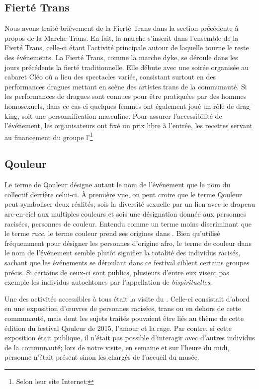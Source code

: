 \subsection{Fierté Trans}
\label{subsec:fiertetrans}
Nous avons traité brièvement de la Fierté Trans dans la section précédente à propos de la Marche Trans.
En fait, la marche s'inscrit dans l'ensemble de la Fierté Trans, celle-ci étant l'activité principale autour de laquelle tourne le reste des événements.
La Fierté Trans, comme la marche dyke, se déroule dans les jours précédents la fierté traditionnelle.
Elle débute avec une soirée organisée au cabaret Cléo où a lieu des spectacles variés, consistant surtout en des performances dragues mettant en scène des artistes trans de la communauté.
Si les performances de dragues sont connues pour être pratiquées par des hommes homosexuels, dans ce cas-ci quelques femmes ont également joué un rôle de drag-king, soit une personnification masculine.
Pour assurer l'accessibilité de l'événement, les organisateurs ont fixé un prix libre à l'entrée, les recettes servant au financement du groupe l'\astteq{}\footnote{Selon leur site Internet: }

\subsection{Qouleur}
\label{subsec:qouleur}
Le terme de Qouleur désigne autant le nom de l'événement que le nom du collectif derrière celui-ci.
À première vue, on peut croire que le terme Qouleur peut symboliser deux réalités, sois la diversité sexuelle par un lien avec le drapeau arc-en-ciel aux multiples couleurs et sois une désignation donnée aux personnes racisées, personnes de couleur.
Entendu comme un terme moins discriminant que le terme \emph{race}, le terme couleur prend ses origines dans .
Bien qu'utilisé fréquemment pour désigner les personnes d'origine afro, le terme de couleur dans le nom de l'événement semble plutôt signifier la totalité des individus racisés, sachant que les événements se déroulant dans ce festival ciblent certains groupes précis.
Si certains de ceux-ci sont publics, plusieurs d'entre eux visent pas exemple les individus autochtones par l'appellation de \emph{bispirituelles}.

Une des activités accessibles à tous était la visite du \mai{}.
Celle-ci consistait d'abord en une exposition d'œuvres de personnes racisées, trans ou en dehors de cette communauté, mais dont les sujets traités pouvaient être liés au thème de cette édition du festival Qouleur de 2015, l'amour et la rage.
Par contre, si cette exposition était publique, il n'était pas possible d'interagir avec d'autres individus de la communauté; lors de notre visite, en semaine et sur l'heure du midi, personne n'était présent sinon les chargés de l'accueil du musée.

